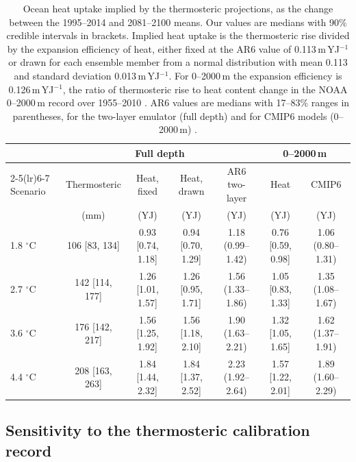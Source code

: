 \documentclass[12pt]{article}
\begin{document}
\begin{table}[!htbp]
\centering
\caption{Ocean heat uptake implied by the thermosteric projections, as the change between the 1995--2014 and 2081--2100 means. Our values are medians with 90\% credible intervals in brackets. Implied heat uptake is the thermosteric rise divided by the expansion efficiency of heat, either fixed at the AR6 value of 0.113\,m\,YJ$^{-1}$ or drawn for each ensemble member from a normal distribution with mean 0.113 and standard deviation 0.013\,m\,YJ$^{-1}$. For 0--2000\,m the expansion efficiency is 0.126\,m\,YJ$^{-1}$, the ratio of thermosteric rise to heat content change in the NOAA 0--2000\,m record over 1955--2010 \citep{Levitus2012}. AR6 values are medians with 17--83\% ranges in parentheses, for the two-layer emulator (full depth) and for CMIP6 models (0--2000\,m) \citep[][Section 9.2.2.1 and Table 9.1]{Fox-Kemper2021}.}
\label{tab:energy_check}
\footnotesize
\setlength{\tabcolsep}{2pt}
\begin{tabular}{lcccccc}
\toprule
 & \multicolumn{4}{c}{Full depth} & \multicolumn{2}{c}{0--2000\,m} \\
\cmidrule(lr){2-5}\cmidrule(lr){6-7}
Scenario & Thermosteric & Heat, fixed & Heat, drawn & AR6 two-layer & Heat & CMIP6 \\
 & (mm) & (YJ) & (YJ) & (YJ) & (YJ) & (YJ) \\
\midrule
1.8 $^\circ$C & 106 [83, 134] & 0.93 [0.74, 1.18] & 0.94 [0.70, 1.29] & 1.18 (0.99--1.42) & 0.76 [0.59, 0.98] & 1.06 (0.80--1.31) \\
2.7 $^\circ$C & 142 [114, 177] & 1.26 [1.01, 1.57] & 1.26 [0.95, 1.71] & 1.56 (1.33--1.86) & 1.05 [0.83, 1.33] & 1.35 (1.08--1.67) \\
3.6 $^\circ$C & 176 [142, 217] & 1.56 [1.25, 1.92] & 1.56 [1.18, 2.10] & 1.90 (1.63--2.21) & 1.32 [1.05, 1.65] & 1.62 (1.37--1.91) \\
4.4 $^\circ$C & 208 [163, 263] & 1.84 [1.44, 2.32] & 1.84 [1.37, 2.52] & 2.23 (1.92--2.64) & 1.57 [1.22, 2.01] & 1.89 (1.60--2.29) \\
\bottomrule
\end{tabular}
\end{table}

\subsection{Sensitivity to the thermosteric calibration record}
\label{s:thermo_records}
\end{document}

